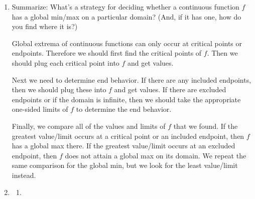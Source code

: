 \documentclass{article}
\begin{document}
\begin{enumerate}
\begin{enumerate}
  \end{enumerate}

\item  \label{global-extrema-strategy-1}


  \begin{problem}[1.5in]
    Summarize: What's a strategy for deciding whether a continuous function $f$ has a global min/max on a particular domain? (And, if it has one, how do you find where it is?)
  \end{problem}

  \begin{solution}
    Global extrema of continuous functions can only occur at critical
    points or endpoints. Therefore we should first find the critical points of
    $f$. Then we should plug each critical point into $f$ and get values.

    Next we need to determine end behavior. If there are any included endpoints, 
    then we should plug these into $f$ and get
    values. If there are excluded endpoints or if the domain is infinite, then
    we should take the appropriate one-sided limits of $f$ to determine the
    end behavior. 

    Finally, we compare all of the values and limits of $f$ that we found.
    If the greatest value/limit occurs at a critical point
    or an included endpoint, then $f$ has a global max there. If
    the greatest value/limit occurs at an excluded endpoint, then
    $f$ does not attain a global max on its domain. We repeat
    the same comparison for the global min, but we look for the
    least value/limit instead.
  \end{solution}

\item 


  \begin{enumerate} 
  \item \label{optimization-can-1-abs-extrema-domain1}


\end{enumerate}
\end{enumerate}
\end{document}
